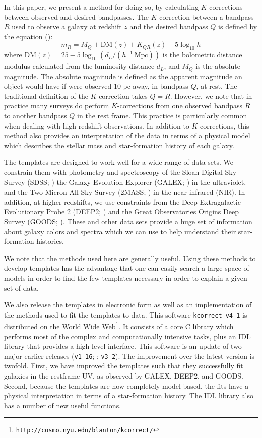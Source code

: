 \documentclass[10pt,preprint]{aastex}
\begin{document}
In this paper, we present a method for doing so, by calculating
$K$-corrections between observed and desired bandpasses.  The
$K$-correction between a bandpass $R$ used to observe a galaxy at
redshift $z$ and the desired bandpass $Q$ is defined by the equation
(\citealt{oke68a, hogg02a}):
\begin{equation}
m_R = M_Q + \mathrm{DM}(z) + K_{QR}(z) - 5 \log_{10} h 
\end{equation}
where $\mathrm{DM}(z) = 25 - 5\log_{10} (d_L / (h^{-1}{\mathrm{~Mpc}}))$ is the
bolometric distance modulus calculated from the luminosity distance
$d_L$, and $M_Q$ is the absolute magnitude. The absolute magnitude is
defined as the apparent magnitude an object would have if were
observed 10 pc away, in bandpass $Q$, at rest.  The traditional
definition of the $K$-correction takes $Q=R$. However, we note that in
practice many surveys do perform $K$-corrections from one observed
bandpass $R$ to another bandpass $Q$ in the rest frame. This practice
is particularly common when dealing with high redshift observations.
In addition to $K$-corrections, this method also provides an
interpretation of the data in terms of a physical model which
describes the stellar mass and star-formation history of each galaxy.

The templates are designed to work well for a wide range of data sets.
We constrain them with photometry and spectroscopy of the Sloan
Digital Sky Survey (SDSS; \citealt{york00a}) the Galaxy Evolution
Explorer (GALEX; \citealt{martin05a}) in the ultraviolet, and the
Two-Micron All Sky Survey (2MASS; \citealt{skrutskie97a}) in the near
infrared (NIR). In addition, at higher redshifts, we use constraints
from the Deep Extragalactic Evolutionary Probe 2 (DEEP2;
\citealt{davis03a, faber03a}) and the Great Observatories Origins Deep
Survey (GOODS;
\citealt{giavalisco04a}).  These and other data sets provide a huge set of
information about galaxy colors and spectra which we can use to help
understand their star-formation histories.

We note that the methods used here are generally useful. Using these
methods to develop templates has the advantage that one can easily
search a large space of models in order to find the few templates
necessary in order to explain a given set of data.

We also release the templates in electronic form as well as an
implementation of the methods used to fit the templates to data. This
software {\tt kcorrect v4\_1} is distributed on the World Wide
Web{\footnote {\tt http://cosmo.nyu.edu/blanton/kcorrect/}}. It
consists of a core C library which performs most of the complex and
computationally intensive tasks, plus an IDL library that provides a
high-level interface.  This software is an update of two major earlier
releases ({\tt v1\_16}; \citealt{blanton03b}; {\tt v3\_2}). The
improvement over the latest version is twofold. First, we have
improved the templates such that they successfully fit galaxies in the
restframe UV, as observed by GALEX, DEEP2, and GOODS. Second, because
the templates are now completely model-based, the fits have a physical
interpretation in terms of a star-formation history. The IDL library
also has a number of new useful functions.
\end{document}
